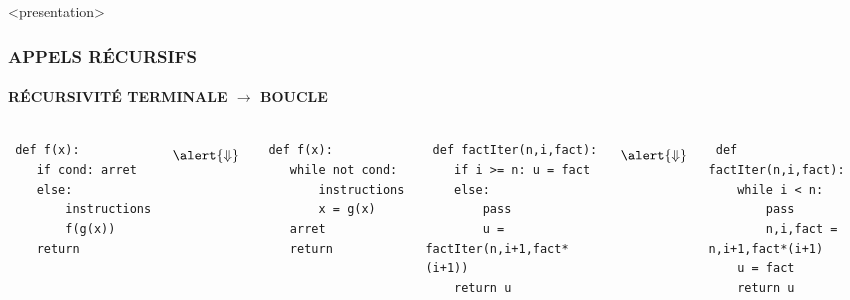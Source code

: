 \begin{frame}<presentation>
\frametitle{\uppercase{Appels récursifs}}
\framesubtitle{\uppercase{récursivité terminale $\rightarrow$ boucle}}
\begin{columns}[T]
\column{4cm}
\begin{py}{4cm}\tt
def f(x):\\
\mbox{}\ \ \ \ if cond: arret\\
\mbox{}\ \ \ \ else:\\
\mbox{}\ \ \ \ \ \ \ \ instructions\\
\mbox{}\ \ \ \ \ \ \ \ f(g(x))\\
\mbox{}\ \ \ \ return
\end{py}

$$\alert{\Downarrow}$$

\begin{py}{4cm}\tt
def f(x):\\
\mbox{}\ \ \ \ while not cond: \\
\mbox{}\ \ \ \ \ \ \ \ instructions\\
\mbox{}\ \ \ \ \ \ \ \ x = g(x)\\
\mbox{}\ \ \ \ arret\\
\mbox{}\ \ \ \ return
\end{py}

\column{6.5cm}
\begin{py}{6.5cm}\tt
def factIter(n,i,fact):\\
\mbox{}\ \ \ \ if i >= n: u = fact\\
\mbox{}\ \ \ \ else:\\
\mbox{}\ \ \ \ \ \ \ \ pass\\
\mbox{}\ \ \ \ \ \ \ \ u = factIter(n,i+1,fact*(i+1))\\
\mbox{}\ \ \ \ return u
\end{py}

$$\alert{\Downarrow}$$

\begin{py}{6.5cm}\tt
def factIter(n,i,fact):\\
\mbox{}\ \ \ \ while i < n:\\
\mbox{}\ \ \ \ \ \ \ \ pass\\
\mbox{}\ \ \ \ \ \ \ \ n,i,fact = n,i+1,fact*(i+1)\\
\mbox{}\ \ \ \ u = fact\\
\mbox{}\ \ \ \ return u
\end{py}
\end{columns}

\end{frame}
